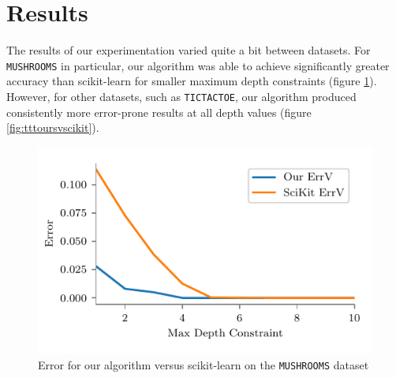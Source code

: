 \documentclass[screen, authorversion, nonacm, sigconf]{acmart}
\begin{document}
\section{Results}

The results of our experimentation varied quite a bit between datasets. For \texttt{MUSHROOMS} in particular, our algorithm was able to achieve significantly greater accuracy than scikit-learn for smaller maximum depth constraints (figure \ref{fig:mushoursvscikit}). However, for other datasets, such as \texttt{TICTACTOE}, our algorithm produced consistently more error-prone results at all depth values (figure \ref{fig:tttoursvscikit}).

\begin{figure}
  \centering
  \includegraphics[width=\columnwidth]{figures/chart_ours_v_scikit_mushrooms.pdf}
  \caption{Error for our algorithm versus scikit-learn on the \texttt{MUSHROOMS} dataset}
  \label{fig:mushoursvscikit}
\end{figure}
\end{document}
